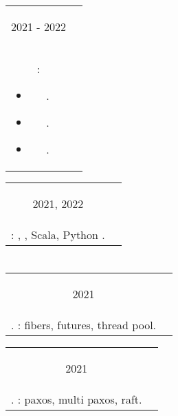\documentclass{article}
\newif\ifen
\newif\ifru
\newcommand{\en}[1]{\ifen#1\fi}
\newcommand{\ru}[1]{\ifru#1\fi}
\newcommand{\entry}[3]{
	\begin{tabular}{ c | c }
    \begin{minipage}{0.05\linewidth}
    	\begin{center}
    		#1
    	\end{center}
    \end{minipage} 
    &
    \begin{minipage}{0.85\linewidth}
        \textbf{#2} \\ \footnotesize{#3}
    \end{minipage}
    \end{tabular}
}
\newcommand{\interval}[2]{
	#1 - #2
}
\begin{document}
\vspace{.1cm}

\entry {\interval{2021}{2022}}
{\ru{Тинькофф}\en{Tinkoff} - \ru{Отдел Кредитных и Брокерских Систем}\en{Credit and Brokerage Systems} - Backend \ru{разработчик}\en{Engineer} - Scala}
{\ru{Разработка и поддержание бэкенда кредитного онлайн брокера на микросервисной архитектуре}\en{Development and maintenance of online credit broker backend on microservice architecture}:
    \begin{itemize}
        \item \ru{Проектирование и реализация бизнес функционала.}\en{Design and implementation of business functionality}.
        \item \ru{Разработка с применением брокеров сообщений: RabbitMQ и Kafka}\en{Integration of message brokers: RabbitMQ and Kafka}.
        \item \ru{Разработка с применением баз данных: MongoDB и PostgreSQL}\en{Integration of databases: MongoDB and PostgreSQL}.
    \end{itemize}
}

\vspace{.1cm}

\entry {2021, 2022}
{\ru{Летняя Школа Слон в Пущино}\en{Summer School <<Slon>> in Pushchino} - \ru{Волонтер-Преподаватель}\en{Volunteer-Tutor}}
{\ru{Проведение курсов}\en{Courses taught}: \ru{Формальные языки}\en{Formal languages}, \ru{Математическая логика}\en{Mathematical logic}, \ru{ФП в }\en{FP in} Scala, Python \ru{с нуля}\en{from scratch}.
}

\section{\ru{Курсы}}
\entry {2021
}
{\ru{МФТИ}\en{MIPT} - \ru{Теория и практика многопоточной синхронизации}\en{Concurrency course} }
{\ru{Язык C\texttt{++}}\en{C\texttt{++}}. \ru{Реализация библиотеки для работы с многопоточностью}\en{Implementation of simple concurrency library}: fibers, futures, thread pool.  }

\vspace{.1cm}

\entry {2021
}
{\ru{МФТИ}\en{MIPT} - \ru{Распределенные системы}\en{Distributed systems} }
{\ru{Язык C\texttt{++}}\en{C\texttt{++}}. \ru{Реализация алгоритмов распределенных консенсуса и репликации}\en{Implementation of distributed consensus and replication algorithms}: paxos, multi paxos, raft.  }

\vspace{.1cm}
\end{document}
